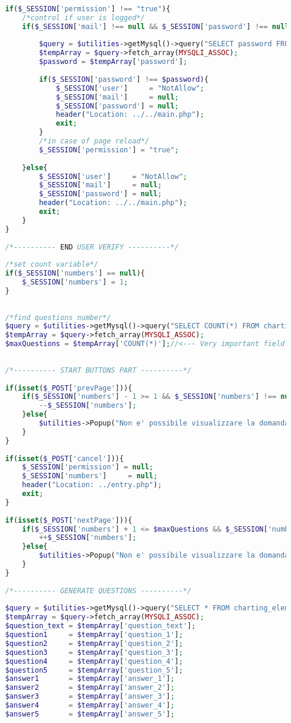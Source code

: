 \begin{lstlisting}[language=php]
	
	if($_SESSION['permission'] !== "true"){
		/*control if user is logged*/
		if($_SESSION['mail'] !== null && $_SESSION['password'] !== null){
			
			$query = $utilities->getMysql()->query("SELECT password FROM user_table1 WHERE (email = '{$_SESSION['mail']}')");
			$tempArray = $query->fetch_array(MYSQLI_ASSOC);
			$password = $tempArray['password'];
			
			if($_SESSION['password'] !== $password){
				$_SESSION['user']     = "NotAllow";
				$_SESSION['mail']     = null;
				$_SESSION['password'] = null;
				header("Location: ../../main.php");
				exit;
			}
			/*in case of page reload*/
			$_SESSION['permission'] = "true";
			
		}else{
			$_SESSION['user']     = "NotAllow";
			$_SESSION['mail']     = null;
			$_SESSION['password'] = null;
			header("Location: ../../main.php");
			exit;
		}
	}
	
	/*---------- END USER VERIFY ----------*/
	
	/*set count variable*/
	if($_SESSION['numbers'] == null){
		$_SESSION['numbers'] = 1;
	}
	
	
	/*find questions number*/
	$query = $utilities->getMysql()->query("SELECT COUNT(*) FROM charting_elements");
	$tempArray = $query->fetch_array(MYSQLI_ASSOC);
	$maxQuestions = $tempArray['COUNT(*)'];//<--- Very important field
	
	
	/*---------- START BUTTONS PART ----------*/
	
	if(isset($_POST['prevPage'])){
		if($_SESSION['numbers'] - 1 >= 1 && $_SESSION['numbers'] !== null){
			--$_SESSION['numbers'];
		}else{
			$utilities->Popup("Non e' possibile visualizzare la domanda precedente");
		}
	}
	
	if(isset($_POST['cancel'])){
		$_SESSION['permission'] = null;
		$_SESSION['numbers']     = null;
		header("Location: ../entry.php");
		exit;
	}
	
	if(isset($_POST['nextPage'])){
		if($_SESSION['numbers'] + 1 <= $maxQuestions && $_SESSION['numbers'] !== null){
			++$_SESSION['numbers'];
		}else{
			$utilities->Popup("Non e' possibile visualizzare la domanda successiva");
		}
	}
	
	/*---------- GENERATE QUESTIONS ----------*/
	
	$query = $utilities->getMysql()->query("SELECT * FROM charting_elements WHERE (id = '{$_SESSION['numbers']}')");
	$tempArray = $query->fetch_array(MYSQLI_ASSOC);
	$question_text = $tempArray['question_text'];
	$question1     = $tempArray['question_1'];
	$question2     = $tempArray['question_2'];
	$question3     = $tempArray['question_3'];
	$question4     = $tempArray['question_4'];
	$question5     = $tempArray['question_5'];
	$answer1       = $tempArray['answer_1'];
	$answer2       = $tempArray['answer_2'];
	$answer3       = $tempArray['answer_3'];
	$answer4       = $tempArray['answer_4'];
	$answer5       = $tempArray['answer_5'];
\end{lstlisting}

